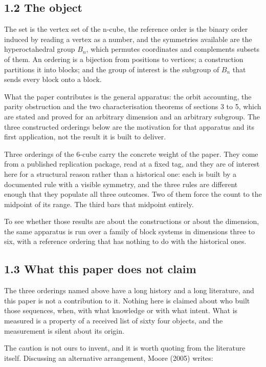 \documentclass[11pt,a4paper]{article}
\begin{document}
\subsection*{1.2 The object}

The set is the vertex set of the n-cube, the reference order is the binary order induced by reading a vertex as a number, and the symmetries available are the hyperoctahedral group $B_n$, which permutes coordinates and complements subsets of them. An ordering is a bijection from positions to vertices; a construction partitions it into blocks; and the group of interest is the subgroup of $B_n$ that sends every block onto a block.

What the paper contributes is the general apparatus: the orbit accounting, the parity obstruction and the two characterisation theorems of sections 3 to 5, which are stated and proved for an arbitrary dimension and an arbitrary subgroup. The three constructed orderings below are the motivation for that apparatus and its first application, not the result it is built to deliver.

Three orderings of the 6-cube carry the concrete weight of the paper. They come from a published replication package, read at a fixed tag, and they are of interest here for a structural reason rather than a historical one: each is built by a documented rule with a visible symmetry, and the three rules are different enough that they populate all three outcomes. Two of them force the count to the midpoint of its range. The third bars that midpoint entirely.

To see whether those results are about the constructions or about the dimension, the same apparatus is run over a family of block systems in dimensions three to six, with a reference ordering that has nothing to do with the historical ones.

\subsection*{1.3 What this paper does not claim}

The three orderings named above have a long history and a long literature, and this paper is not a contribution to it. Nothing here is claimed about who built those sequences, when, with what knowledge or with what intent. What is measured is a property of a received list of sixty four objects, and the measurement is silent about its origin.

The caution is not ours to invent, and it is worth quoting from the literature itself. Discussing an alternative arrangement, Moore (2005) writes:
\end{document}
